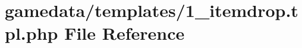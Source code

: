 \hypertarget{1__itemdrop_8tpl_8php}{\section{gamedata/templates/1\+\_\+itemdrop.tpl.\+php File Reference}
\label{1__itemdrop_8tpl_8php}
}
